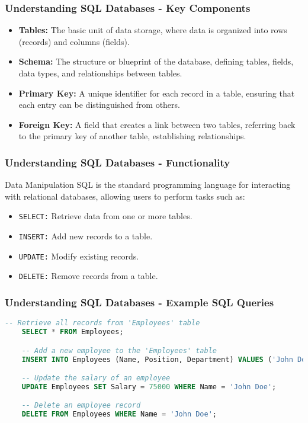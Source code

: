 \documentclass[aspectratio=169]{beamer}
\begin{document}
\begin{frame}[fragile]
    \frametitle{Understanding SQL Databases - Key Components}
    \begin{itemize}
        \item \textbf{Tables:} The basic unit of data storage, where data is organized into rows (records) and columns (fields).
        \item \textbf{Schema:} The structure or blueprint of the database, defining tables, fields, data types, and relationships between tables.
        \item \textbf{Primary Key:} A unique identifier for each record in a table, ensuring that each entry can be distinguished from others.
        \item \textbf{Foreign Key:} A field that creates a link between two tables, referring back to the primary key of another table, establishing relationships.
    \end{itemize}
\end{frame}

\begin{frame}[fragile]
    \frametitle{Understanding SQL Databases - Functionality}
    \begin{block}{Data Manipulation}
        SQL is the standard programming language for interacting with relational databases, allowing users to perform tasks such as:
        \begin{itemize}
            \item \texttt{SELECT:} Retrieve data from one or more tables.
            \item \texttt{INSERT:} Add new records to a table.
            \item \texttt{UPDATE:} Modify existing records.
            \item \texttt{DELETE:} Remove records from a table.
        \end{itemize}
    \end{block}
\end{frame}

\begin{frame}[fragile]
    \frametitle{Understanding SQL Databases - Example SQL Queries}
    \begin{lstlisting}[language=SQL]
    -- Retrieve all records from 'Employees' table
    SELECT * FROM Employees;

    -- Add a new employee to the 'Employees' table
    INSERT INTO Employees (Name, Position, Department) VALUES ('John Doe', 'Analyst', 'Finance');

    -- Update the salary of an employee
    UPDATE Employees SET Salary = 75000 WHERE Name = 'John Doe';

    -- Delete an employee record
    DELETE FROM Employees WHERE Name = 'John Doe';
    \end{lstlisting}
\end{frame}
\end{document}
